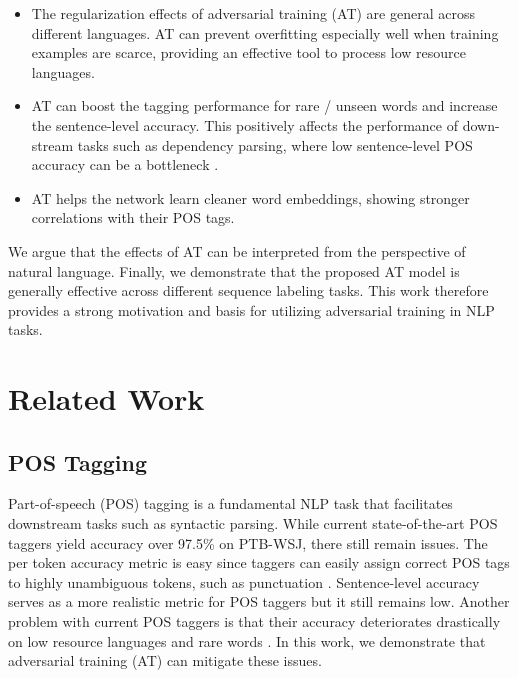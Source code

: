 \documentclass[11pt,a4paper]{article}
\begin{document}
\begin{itemize}[topsep=2mm]
\setlength{\leftskip}{-3mm}
\setlength{\parskip}{0mm}
    \item The regularization effects of  adversarial training (AT) are general across different languages. AT can prevent overfitting especially well when training examples are scarce, providing an effective tool to process low resource languages.

    \item AT can boost the tagging performance for rare \!/\! unseen words and increase the sentence-level accuracy. This positively affects the performance of down-stream tasks such as dependency parsing, where low sentence-level POS accuracy can be a bottleneck \cite{Manning:2011:from97to100}.
    
    \item AT helps the network learn cleaner word embeddings, showing stronger correlations with their POS tags. \vspace{-1mm} 
\end{itemize}
We argue that the effects of AT %
can be interpreted from the perspective of natural language.
Finally, we demonstrate that the proposed AT model is generally effective across different sequence labeling tasks.
This work therefore provides a strong motivation and basis for utilizing adversarial training in
NLP 
tasks.








\section{Related Work}
\subsection{POS Tagging}

Part-of-speech (POS) tagging is a fundamental NLP task that facilitates downstream tasks such as syntactic parsing.
While current state-of-the-art POS taggers \cite{wang:2015,ma-hovy:2016:P16-1} yield accuracy over 97.5\% on PTB-WSJ, there still remain issues.
The per token accuracy metric is easy since taggers can easily assign correct POS tags to highly unambiguous tokens, such as punctuation \cite{Manning:2011:from97to100}.
Sentence-level accuracy serves as a more realistic metric for POS taggers but it still remains low. 
Another problem with current POS taggers is that their accuracy deteriorates drastically on low resource languages %
and rare words \cite{plank2016multilingual}.
In this work, we demonstrate that adversarial training (AT) can mitigate these issues.
\end{document}

